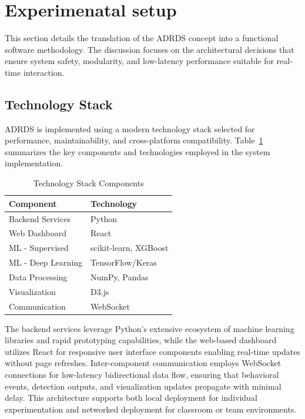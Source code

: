 \section{Experimenatal setup}

This section details the translation of the ADRDS concept into a functional software methodology. The discussion focuses on the architectural decisions that ensure system safety, modularity, and low-latency performance suitable for real-time interaction.

\subsection{Technology Stack}

ADRDS is implemented using a modern technology stack selected for performance, maintainability, and cross-platform compatibility. Table~\ref{tab:techstack} summarizes the key components and technologies employed in the system implementation.

\begin{table}[t]
\centering
\caption{Technology Stack Components}
\label{tab:techstack}
\begin{tabular}{|l|l|}
\hline
\textbf{Component} & \textbf{Technology} \\ \hline
Backend Services & Python \\ \hline
Web Dashboard & React \\ \hline
ML - Supervised & scikit-learn, XGBoost \\ \hline
ML - Deep Learning & TensorFlow/Keras \\ \hline
Data Processing & NumPy, Pandas \\ \hline
Visualization & D3.js \\ \hline
Communication & WebSocket \\ \hline
\end{tabular}
\end{table}

The backend services leverage Python's extensive ecosystem of machine learning libraries \cite{pedregosa2011scikit} and rapid prototyping capabilities, while the web-based dashboard utilizes React for responsive user interface components enabling real-time updates without page refreshes. Inter-component communication employs WebSocket connections for low-latency bidirectional data flow, ensuring that behavioral events, detection outputs, and visualization updates propagate with minimal delay. This architecture supports both local deployment for individual experimentation and networked deployment for classroom or team environments.

